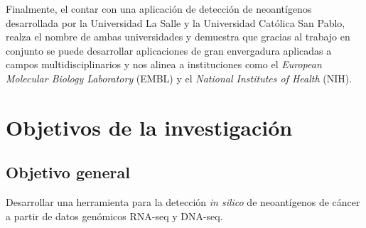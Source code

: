 \documentclass[a4paper,11pt]{article}
\begin{document}
Finalmente, el contar con una aplicación de detección de neoantígenos desarrollada por la Universidad La Salle y la Universidad Católica San Pablo, realza el nombre de ambas universidades y demuestra que gracias al trabajo en conjunto se puede desarrollar aplicaciones de gran envergadura aplicadas a campos multidisciplinarios y nos alinea a instituciones como el \textit{European Molecular Biology Laboratory} (EMBL) y el \textit{National Institutes of Health} (NIH).

	
	
\section{Objetivos de la investigación}
	
	\subsection{Objetivo general}
	
	Desarrollar una herramienta  para la detección \textit{in silico} de neoantígenos de cáncer a partir de datos genómicos RNA-seq y DNA-seq.
	
\end{document}
